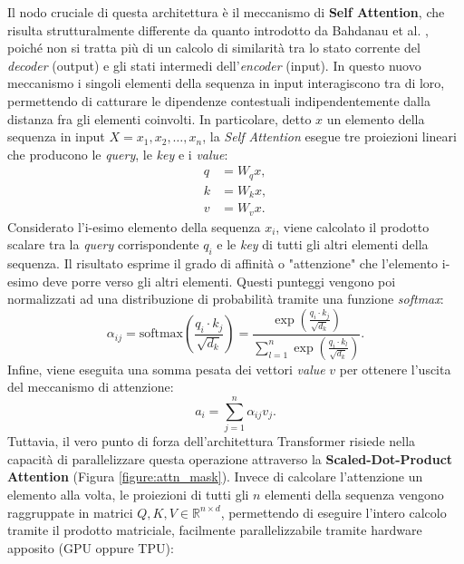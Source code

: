 Il nodo cruciale di questa architettura è il meccanismo di \textbf{Self Attention}, che risulta strutturalmente differente da quanto introdotto da Bahdanau et al. \cite{bahdanau2016neuralmachinetranslationjointly}, poiché non si tratta più di un calcolo di similarità tra lo stato corrente del \textit{decoder} (output) e gli stati intermedi dell'\textit{encoder} (input). In questo nuovo meccanismo i singoli elementi della sequenza in input interagiscono tra di loro, permettendo di catturare le dipendenze contestuali indipendentemente dalla distanza fra gli elementi coinvolti. In particolare, detto $x$ un elemento della sequenza in input $X = {x_1, x_2,\dots, x_n}$, la \textit{Self Attention} esegue tre proiezioni lineari che producono le \textit{query}, le \textit{key} e i \textit{value}:
\begin{equation}
    \begin{aligned}
        q & = W_q x, \\
        k & = W_k x, \\
        v & = W_v x.
    \end{aligned}
\end{equation}
Considerato l'i-esimo elemento della sequenza $x_i$, viene calcolato il prodotto scalare tra la \textit{query} corrispondente $q_i$ e le \textit{key} di tutti gli altri elementi della sequenza. Il risultato esprime il grado di affinità o "attenzione" che l'elemento i-esimo deve porre verso gli altri elementi. Questi punteggi vengono poi normalizzati ad una distribuzione di probabilità tramite una funzione \textit{softmax}:
\begin{equation}
    \alpha_{ij} = \text{softmax} \left( \frac{q_i \cdot k_j}{\sqrt{d_k}} \right) = \frac{\exp \left( \frac{q_i \cdot k_j}{\sqrt{d_k}} \right)}{\sum_{l=1}^{n} \exp \left( \frac{q_i \cdot k_l}{\sqrt{d_k}} \right)}.
\end{equation}
Infine, viene eseguita una somma pesata dei vettori \textit{value} $v$ per ottenere l'uscita del meccanismo di attenzione:
\begin{equation}
    a_i = \sum_{j=1}^{n} \alpha_{ij} v_j.
\end{equation}
Tuttavia, il vero punto di forza dell'architettura Transformer risiede nella capacità di parallelizzare questa operazione attraverso la \textbf{Scaled-Dot-Product Attention} (Figura \ref{figure:attn_mask}).
Invece di calcolare l'attenzione un elemento alla volta, le proiezioni di tutti gli $n$ elementi della sequenza vengono raggruppate in matrici $Q, K, V \in \mathbb{R}^{n \times d}$, permettendo di eseguire l'intero calcolo tramite il prodotto matriciale, facilmente parallelizzabile tramite hardware apposito (GPU oppure TPU):
